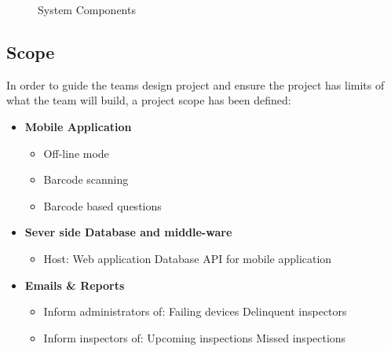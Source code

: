 \documentclass[Letter,11pt]{article}
\begin{document}
	\begin{figure}[h]
		\centering
		
		\caption{\label{sysConn} System Components}
	\end{figure}
	
	\subsection{Scope}\label{scope}
	In order to guide the teams design project and ensure the project has limits of what the team will build, a project scope has been defined:
	\\
	\begin{minipage}[t]{0.5\textwidth}
		\begin{itemize}
			\item \textbf{Mobile Application}
			\begin{itemize}
				\item Off-line mode
				\item Barcode scanning
				\item Barcode based questions
			\end{itemize}
			\item \textbf{Sever side Database and middle-ware}
			\begin{itemize}
				\item Host:
					\subitem Web application
					\subitem Database API for mobile application
			\end{itemize}
			\item\textbf{ Emails \& Reports}
			\begin{itemize}
				\item Inform administrators of:
					\subitem Failing devices
					\subitem Delinquent inspectors
				\item Inform inspectors of:
					\subitem Upcoming inspections
					\subitem Missed inspections
			\end{itemize}
		\end{itemize}
	\end{minipage}
\end{document}
